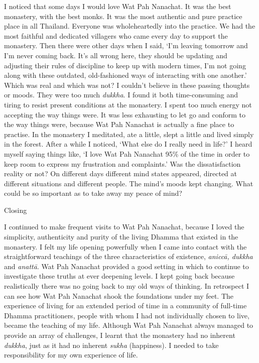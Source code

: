 I noticed that some days I would love Wat Pah Nanachat. It was the best
monastery, with the best monks. It was the most authentic and pure
practice place in all Thailand. Everyone was wholeheartedly into the
practice. We had the most faithful and dedicated villagers who came
every day to support the monastery. Then there were other days when I
said, `I'm leaving tomorrow and I'm never coming back. It's all wrong
here, they should be updating and adjusting their rules of discipline to
keep up with modern times, I'm not going along with these outdated,
old-fashioned ways of interacting with one another.' Which was real and
which was not? I couldn't believe in these passing thoughts or moods.
They were too much \emph{dukkha}. I found it both time-consuming and
tiring to resist present conditions at the monastery. I spent too much
energy not accepting the way things were. It was less exhausting to let
go and conform to the way things were, because Wat Pah Nanachat is
actually a fine place to practise. In the monastery I meditated, ate a
little, slept a little and lived simply in the forest. After a while I
noticed, `What else do I really need in life?' I heard myself saying
things like, `I love Wat Pah Nanachat 95\% of the time in order to keep
room to express my frustration and complaints.' Was the dissatisfaction
reality or not? On different days different mind states appeared,
directed at different situations and different people. The mind's moods
kept changing. What could be so important as to take away my peace of
mind?

Closing

I continued to make frequent visits to Wat Pah Nanachat, because I loved
the simplicity, authenticity and purity of the living Dhamma that
existed in the monastery. I felt my life opening powerfully when I came
into contact with the straightforward teachings of the three
characteristics of existence, \emph{aniccā, dukkha} and \emph{anattā}.
Wat Pah Nanachat provided a good setting in which to continue to
investigate these truths at ever deepening levels. I kept going back
because realistically there was no going back to my old ways of
thinking. In retrospect I can see how Wat Pah Nanachat shook the
foundations under my feet. The experience of living for an extended
period of time in a community of full-time Dhamma practitioners, people
with whom I had not individually chosen to live, became the teaching of
my life. Although Wat Pah Nanachat always managed to provide an array of
challenges, I learnt that the monastery had no inherent \emph{dukkha},
just as it had no inherent \emph{sukha} (happiness). I needed to take
responsibility for my own experience of life.

